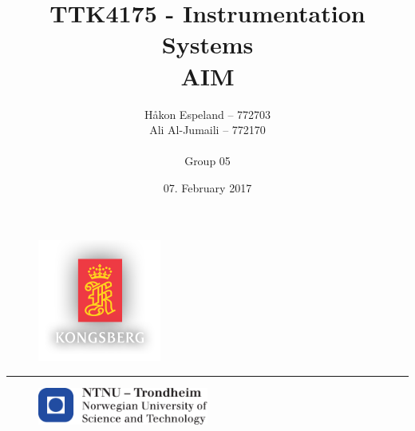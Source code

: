 \documentclass{article}
\title{TTK4175 - Instrumentation Systems\\\LARGE{\textbf{AIM}}}
\author{Håkon Espeland -- 772703 \\ Ali Al-Jumaili -- 772170 \\\\ Group 05}
\date{07. February 2017}
\begin{document}
\begin{figure}
    \centering
    \includegraphics[width=0.36\textwidth]{images/KONGSBERG-logo.png}
    \end{figure}

\begin{titlepage}
    \maketitle
    \rule{\linewidth}{0.5mm}
    \begin{figure}
    \centering
    \includegraphics[width=0.5\textwidth]{images/logontnu_eng}
    \end{figure}
    \thispagestyle{empty}
\end{titlepage}
\newpage\null\thispagestyle{empty}\newpage
\tableofcontents
\thispagestyle{empty} %
\newpage   


\setcounter{page}{1}



%
\end{document}
